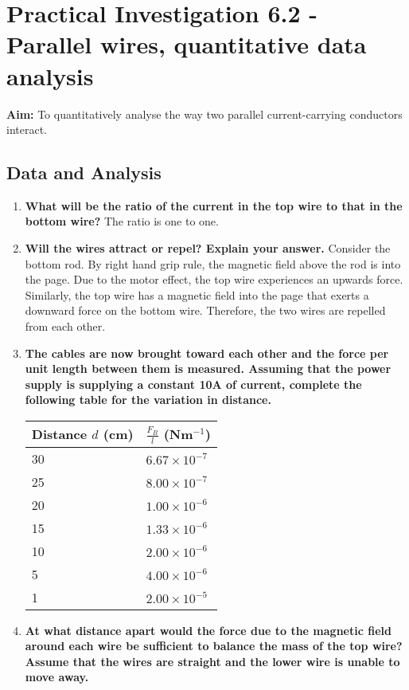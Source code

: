 \section{Practical Investigation 6.2 - Parallel wires, quantitative data analysis} \label{24/02/2025}

	\textbf{Aim:} To quantitatively analyse the way two parallel current-carrying conductors interact.

	\subsection{Data and Analysis}
	
		\begin{enumerate}
			\item \textbf{What will be the ratio of the current in the top wire to that in the bottom wire?}
				The ratio is one to one.

			\item \textbf{Will the wires attract or repel? Explain your answer.}
				Consider the bottom rod. By right hand grip rule, the magnetic field above the rod is into the page. Due to the motor effect, the top wire experiences an upwards force. Similarly, the top wire has a magnetic field into the page that exerts a downward force on the bottom wire. Therefore, the two wires are repelled from each other.

			\item \textbf{The cables are now brought toward each other and the force per unit length between them is measured. Assuming that the power supply is supplying a constant 10A of current, complete the following table for the variation in distance.}

				\begin{table}[htbp]
					\centering
					\begin{tabular}{l|l}
							Distance $d$ (cm)	& $\frac{F_B}{l}$ (Nm$^{-1}$) \\ \hline
							30			& $6.67 \times 10^{-7}$ \\
							25			& $8.00 \times 10^{-7}$ \\
							20			& $1.00 \times 10^{-6}$ \\
							15			& $1.33 \times 10^{-6}$ \\
							10			& $2.00 \times 10^{-6}$ \\
							5			& $4.00 \times 10^{-6}$ \\
							1			& $2.00 \times 10^{-5}$
					\end{tabular}
				\end{table}

			\item \textbf{At what distance apart would the force due to the magnetic field around each wire be sufficient to balance the mass of the top wire? Assume that the wires are straight and the lower wire is unable to move away.}
		\end{enumerate}

